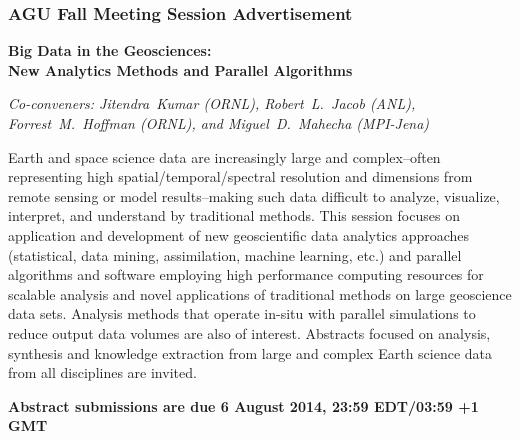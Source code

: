 \begin{frame}
 \frametitle{AGU Fall Meeting Session Advertisement}\small
 \begin{center}
  \vskip-0.15in
  \textbf{\large Big Data in the Geosciences: \\ New Analytics Methods and Parallel Algorithms}
 \end{center}

 \medskip
 \vbox{\footnotesize\textit{Co-conveners: Jitendra~Kumar (ORNL), Robert~L.~Jacob (ANL), Forrest~M.~Hoffman (ORNL), and Miguel~D.~Mahecha (MPI-Jena)}}


 \medskip
 \vbox{\footnotesize Earth and space science data are increasingly large and
 complex--often representing high spatial/temporal/spectral resolution
 and dimensions from remote sensing or model results--making such data
 difficult to analyze, visualize, interpret, and understand by traditional
 methods.  This session focuses on application and development of new
 geoscientific data analytics approaches (statistical, data mining,
 assimilation, machine learning, etc.) and parallel algorithms and
 software employing high performance computing resources for scalable
 analysis and novel applications of traditional methods on large
 geoscience data sets.  Analysis methods that operate in-situ with
 parallel simulations to reduce output data volumes are also of interest.
 Abstracts focused on analysis, synthesis and knowledge extraction from
 large and complex Earth science data from all disciplines are invited.}

 \bigskip
 \centerline{\color{red} \textbf{Abstract submissions are due 6 August 2014, 23:59 EDT/03:59 +1 GMT}}

\end{frame}
